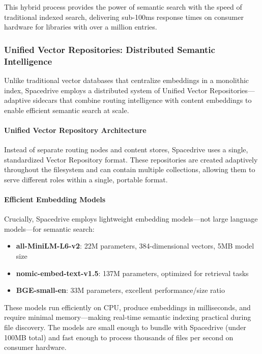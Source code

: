 \documentclass[sigconf]{acmart}
\begin{document}
This hybrid process provides the power of semantic search with the speed of traditional indexed search, delivering sub-100ms response times on consumer hardware for libraries with over a million entries.

\subsubsection{Unified Vector Repositories: Distributed Semantic Intelligence}

Unlike traditional vector databases that centralize embeddings in a monolithic index, Spacedrive employs a distributed system of Unified Vector Repositories—adaptive sidecars that combine routing intelligence with content embeddings to enable efficient semantic search at scale.

\paragraph{Unified Vector Repository Architecture}
Instead of separate routing nodes and content stores, Spacedrive uses a single, standardized Vector Repository format. These repositories are created adaptively throughout the filesystem and can contain multiple collections, allowing them to serve different roles within a single, portable format.

\paragraph{Efficient Embedding Models}
Crucially, Spacedrive employs lightweight embedding models—not large language models—for semantic search:
\begin{itemize}
    \item \textbf{all-MiniLM-L6-v2}: 22M parameters, 384-dimensional vectors, 5MB model size
    \item \textbf{nomic-embed-text-v1.5}: 137M parameters, optimized for retrieval tasks
    \item \textbf{BGE-small-en}: 33M parameters, excellent performance/size ratio
\end{itemize}

These models run efficiently on CPU, produce embeddings in milliseconds, and require minimal memory—making real-time semantic indexing practical during file discovery. The models are small enough to bundle with Spacedrive (under 100MB total) and fast enough to process thousands of files per second on consumer hardware.
\end{document}
